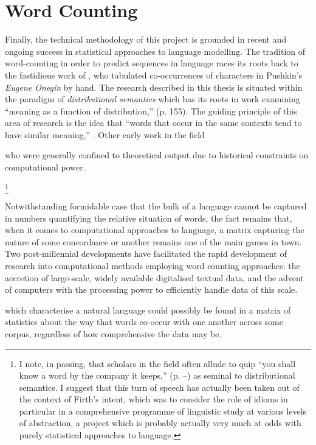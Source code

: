 \section{Word Counting}
Finally, the technical methodology of this project is grounded in recent and ongoing success in statistical approaches to language modelling.  The tradition of word-counting in order to predict sequences in language races its roots back to the fastidious work of \cite{Markov}, who tabulated co-occurrences of characters in Pushkin's \emph{Eugene Onegin} by hand.  The research described in this thesis is situated within the paradigm of \emph{distributional semantics} which has its roots in  work examining ``meaning as a function of distribution,'' (p. 155).  The guiding principle of this area of research is the idea that ``words that occur in the same contexts tend to have similar meaning,'' \citep[][p. 126]{Pantel2005}.  Other early work in the field

who were generally confined to theoretical output due to historical constraints on computational power.

\footnote{I note, in passing, that scholars in the field often allude to  quip ``you shall know a word by the company it keeps,'' (p. --) as seminal to distributional semantics.  I suggest that this turn of speech has actually been taken out of the context of Firth's intent, which was to consider the role of idioms in particular in a comprehensive programme of linguistic study at various levels of abstraction, a project which is probably actually very much at odds with purely statistical approaches to language.}

Notwithstanding  formidable case that the bulk of a language cannot be captured in numbers quantifying the relative situation of words, the fact remains that, when it comes to computational approaches to language, a matrix capturing the nature of some concordance or another remains one of the main games in town.  Two post-millennial developments have facilitated the rapid development of research into computational methods employing word counting approaches: the accretion of large-scale, widely available digitalised textual data, and the advent of computers with the processing power to efficiently handle data of this scale.

which characterise a natural language could possibly be found in a matrix of statistics about the way that words co-occur with one another across some corpus, regardless of how comprehensive the data may be.


